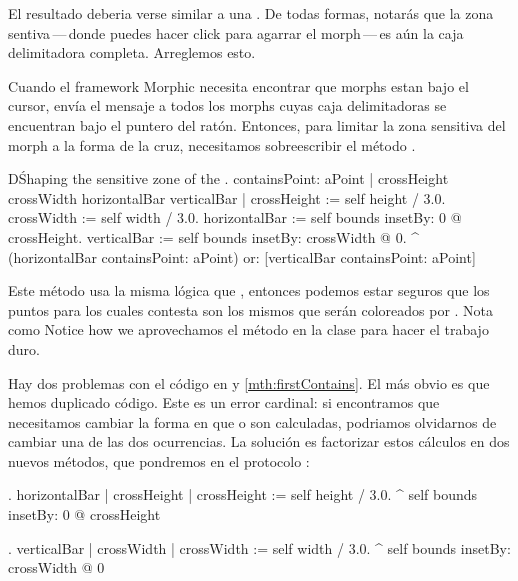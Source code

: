 \documentclass[a4paper,10pt,twoside]{book}
\begin{document}
El resultado deberia verse similar a una .
De todas formas, notar\'as que la zona sentiva\,---\,donde puedes hacer click para agarrar el morph\,---\,es a\'un la caja delimitadora completa.  Arreglemos esto.

Cuando el framework Morphic necesita encontrar que morphs estan bajo el cursor, env\'ia el mensaje  a todos los morphs cuyas caja delimitadoras se encuentran bajo el puntero del rat\'on.
Entonces, para limitar la zona sensitiva del morph a la forma de la cruz, necesitamos sobreescribir el m\'etodo .


\begin{method}[firstContains]{D\'Shaping the sensitive zone of the .}
containsPoint: aPoint
	| crossHeight crossWidth horizontalBar verticalBar |
	crossHeight := self height / 3.0.
	crossWidth := self width / 3.0.
	horizontalBar := self bounds insetBy: 0 @ crossHeight.
	verticalBar := self bounds insetBy: crossWidth @ 0.
	^ (horizontalBar containsPoint: aPoint)
		or: [verticalBar containsPoint: aPoint]
\end{method}

Este m\'etodo usa la misma l\'ogica que , entonces podemos estar seguros que los puntos para los cuales   contesta  son los mismos que ser\'an coloreados por .
Nota como 
Notice how we aprovechamos el m\'etodo  en la clase  para hacer el trabajo duro.

Hay dos problemas con el c\'odigo en  y \ref{mth:firstContains}.
El m\'as obvio es que hemos duplicado c\'odigo.
Este es un error cardinal: si encontramos que necesitamos cambiar la forma en que  o  son calculadas, podriamos olvidarnos de cambiar una de las dos ocurrencias.
La solución es factorizar estos c\'alculos en dos nuevos m\'etodos, que pondremos en el protocolo  :

\begin{method}{.}
horizontalBar
	| crossHeight |
	crossHeight := self height / 3.0.
	^ self bounds insetBy: 0 @ crossHeight
\end{method}

\begin{method}{.}
verticalBar
	| crossWidth |
	crossWidth := self width / 3.0.
	^ self bounds insetBy: crossWidth @ 0
\end{method}
\end{document}

